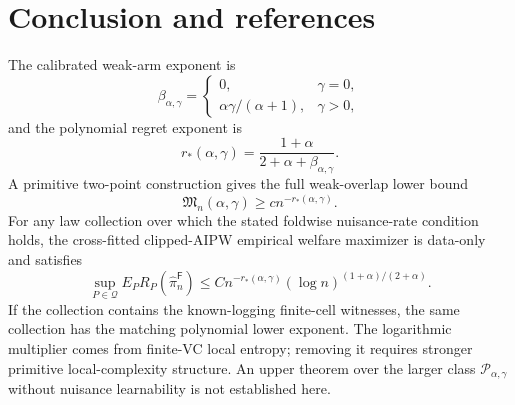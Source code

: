 \documentclass[11pt]{article}
\theoremstyle{definition}
\theoremstyle{plain}
\theoremstyle{remark}
\begin{document}
\section{Conclusion and references}
The calibrated weak-arm exponent is
\[
\beta_{\alpha,\gamma}=
\begin{cases}
0,&\gamma=0,\\
\alpha\gamma/(\alpha+1),&\gamma>0,
\end{cases}
\]
and the polynomial regret exponent is
\[
r_*(\alpha,\gamma)=
\frac{1+\alpha}{2+\alpha+\beta_{\alpha,\gamma}}.
\]
A primitive two-point construction gives the full weak-overlap lower bound
\[
\mathfrak M_n(\alpha,\gamma)\ge c n^{-r_*(\alpha,\gamma)}.
\]
For any law collection over which the stated foldwise nuisance-rate condition
holds, the cross-fitted clipped-AIPW empirical welfare maximizer is data-only
and satisfies
\[
\sup_{P\in\mathcal Q}
E_P R_P(\widehat\pi_n^{\mathsf F})
\le
C n^{-r_*(\alpha,\gamma)}(\log n)^{(1+\alpha)/(2+\alpha)}.
\]
If the collection contains the known-logging finite-cell witnesses, the same
collection has the matching polynomial lower exponent.  The logarithmic
multiplier comes from finite-VC local entropy; removing it requires stronger
primitive local-complexity structure.  An upper theorem over the larger class
\(\mathcal P_{\alpha,\gamma}\) without nuisance learnability is not
established here.
\end{document}
